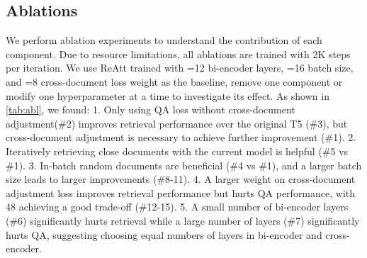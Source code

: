 \documentclass[11pt, dvipsnames]{article}
\newcommand{\ours}{ReAtt\xspace}
\newcommand{\adjustment}{cross-document adjustment\xspace}
\newcommand{\adjustloss}{cross-document adjustment loss\xspace}
\begin{document}
\subsection{Ablations}
We perform ablation experiments to understand the contribution of each component.
Due to resource limitations, all ablations are trained with 2K steps per iteration.
We use \ours trained with =12 bi-encoder layers, =16 batch size, and =8 cross-document loss weight as the baseline, remove one component or modify one hyperparameter at a time to investigate its effect.
As shown in \autoref{tab:abl}, we found: 1. Only using QA loss without \adjustment (\#2) improves retrieval performance over the original T5 (\#3), but \adjustment is necessary to achieve further improvement (\#1). 2. Iteratively retrieving close documents with the current model is helpful (\#5 vs \#1). 3. In-batch random documents are beneficial (\#4 vs \#1), and a larger batch size leads to larger improvements (\#8-11). 4. A larger weight on \adjustloss improves retrieval performance but hurts QA performance, with 48 achieving a good trade-off (\#12-15). 5. A small number of bi-encoder layers (\#6) significantly hurts retrieval while a large number of layers (\#7) significantly hurts QA, suggesting choosing equal numbers of layers in bi-encoder and cross-encoder.
\end{document}
